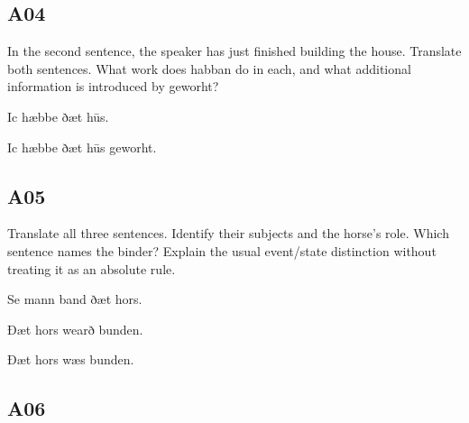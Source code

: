 \subsection*{A04}

\par\begin{minipage}{\linewidth}\raggedright
In the second sentence, the speaker has just finished building the house. Translate both sentences. What work does habban do in each, and what additional information is introduced by geworht?

Ic hæbbe ðæt hūs.

Ic hæbbe ðæt hūs geworht.

\end{minipage}\par\addvspace{4pt}

\subsection*{A05}

\par\begin{minipage}{\linewidth}\raggedright
Translate all three sentences. Identify their subjects and the horse’s role. Which sentence names the binder? Explain the usual event/\allowbreak{}state distinction without treating it as an absolute rule.

Se mann band ðæt hors.

Ðæt hors wearð bunden.

Ðæt hors wæs bunden.

\end{minipage}\par\addvspace{4pt}

\subsection*{A06}

